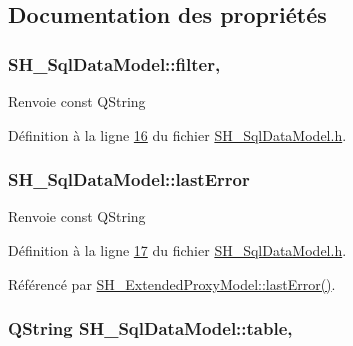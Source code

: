 \subsection{Documentation des propriétés}
\hypertarget{classSH__SqlDataModel_a1f3b35273198f9c67ca4bca5b29876e9}{
\subsubsection[{filter}]{\setlength{\rightskip}{0pt plus 5cm}S\-H\-\_\-\-Sql\-Data\-Model\-::filter\hspace{0.3cm}{\ttfamily [read]}, {\ttfamily [write]}}}\label{classSH__SqlDataModel_a1f3b35273198f9c67ca4bca5b29876e9}
\begin{DoxyReturn}{Renvoie}
const Q\-String 
\end{DoxyReturn}


Définition à la ligne \hyperlink{SH__SqlDataModel_8h_source_l00016}{16} du fichier \hyperlink{SH__SqlDataModel_8h_source}{S\-H\-\_\-\-Sql\-Data\-Model.\-h}.

\hypertarget{classSH__SqlDataModel_a28af51642aee51bc7e0ce19b97c57b60}{
\subsubsection[{last\-Error}]{\setlength{\rightskip}{0pt plus 5cm}S\-H\-\_\-\-Sql\-Data\-Model\-::last\-Error\hspace{0.3cm}{\ttfamily [read]}}}\label{classSH__SqlDataModel_a28af51642aee51bc7e0ce19b97c57b60}
\begin{DoxyReturn}{Renvoie}
const Q\-String 
\end{DoxyReturn}


Définition à la ligne \hyperlink{SH__SqlDataModel_8h_source_l00017}{17} du fichier \hyperlink{SH__SqlDataModel_8h_source}{S\-H\-\_\-\-Sql\-Data\-Model.\-h}.



Référencé par \hyperlink{classSH__ExtendedProxyModel_afb11fa89e1181d88843ea0f7fb3fe654}{S\-H\-\_\-\-Extended\-Proxy\-Model\-::last\-Error()}.

\hypertarget{classSH__SqlDataModel_afd3e2e62c847463c5177ccad35ad4992}{
\subsubsection[{table}]{\setlength{\rightskip}{0pt plus 5cm}Q\-String S\-H\-\_\-\-Sql\-Data\-Model\-::table\hspace{0.3cm}{\ttfamily [read]}, {\ttfamily [write]}}}\label{classSH__SqlDataModel_afd3e2e62c847463c5177ccad35ad4992}


